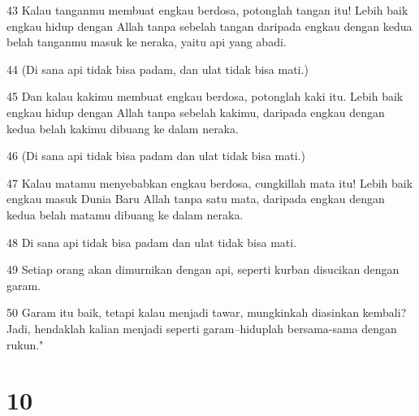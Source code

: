 \par 43 Kalau tanganmu membuat engkau berdosa, potonglah tangan itu! Lebih baik engkau hidup dengan Allah tanpa sebelah tangan daripada engkau dengan kedua belah tanganmu masuk ke neraka, yaitu api yang abadi.
\par 44 (Di sana api tidak bisa padam, dan ulat tidak bisa mati.)
\par 45 Dan kalau kakimu membuat engkau berdosa, potonglah kaki itu. Lebih baik engkau hidup dengan Allah tanpa sebelah kakimu, daripada engkau dengan kedua belah kakimu dibuang ke dalam neraka.
\par 46 (Di sana api tidak bisa padam dan ulat tidak bisa mati.)
\par 47 Kalau matamu menyebabkan engkau berdosa, cungkillah mata itu! Lebih baik engkau masuk Dunia Baru Allah tanpa satu mata, daripada engkau dengan kedua belah matamu dibuang ke dalam neraka.
\par 48 Di sana api tidak bisa padam dan ulat tidak bisa mati.
\par 49 Setiap orang akan dimurnikan dengan api, seperti kurban disucikan dengan garam.
\par 50 Garam itu baik, tetapi kalau menjadi tawar, mungkinkah diasinkan kembali? Jadi, hendaklah kalian menjadi seperti garam--hiduplah bersama-sama dengan rukun."

\chapter{10}

